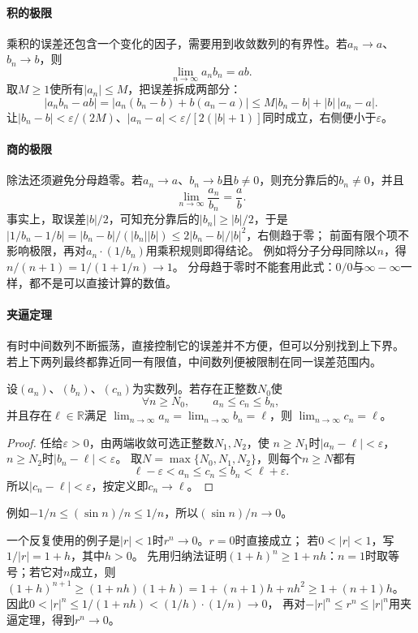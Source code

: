\paragraph{积的极限}
乘积的误差还包含一个变化的因子，需要用到收敛数列的有界性。若$a_n\to a$、$b_n\to b$，则
\[
 \lim_{n\to\infty}a_nb_n=ab.
\]
取$M\geq1$使所有$|a_n|\leq M$，把误差拆成两部分：
\[
 |a_nb_n-ab|=|a_n(b_n-b)+b(a_n-a)|\leq M|b_n-b|+|b|\,|a_n-a|.
\]
让$|b_n-b|<\varepsilon/(2M)$、$|a_n-a|<\varepsilon/[2(|b|+1)]$同时成立，右侧便小于$\varepsilon$。

\paragraph{商的极限}
除法还须避免分母趋零。若$a_n\to a$、$b_n\to b$且$b\neq0$，则充分靠后的$b_n\neq0$，并且
\[
 \lim_{n\to\infty}\frac{a_n}{b_n}=\frac ab.
\]
事实上，取误差$|b|/2$，可知充分靠后的$|b_n|\geq|b|/2$，于是
$|1/b_n-1/b|=|b_n-b|/(|b_n||b|)\leq2|b_n-b|/|b|^2$，右侧趋于零；
前面有限个项不影响极限，再对$a_n\cdot(1/b_n)$用乘积规则即得结论。
例如将分子分母同除以$n$，得$n/(n+1)=1/(1+1/n)\to1$。
分母趋于零时不能套用此式：$0/0$与$\infty-\infty$一样，都不是可以直接计算的数值。

\paragraph{夹逼定理}
有时中间数列不断振荡，直接控制它的误差并不方便，但可以分别找到上下界。
若上下两列最终都靠近同一有限值，中间数列便被限制在同一误差范围内。
\begin{theorem}[夹逼定理]
\label{thm:analysis-sequence-squeeze}
设$(a_n)$、$(b_n)$、$(c_n)$为实数列。若存在正整数$N_0$使
\[
 \forall n\geq N_0,\qquad a_n\leq c_n\leq b_n,
\]
并且存在$\ell\in\mathbb R$满足
$\lim_{n\to\infty}a_n=\lim_{n\to\infty}b_n=\ell$，则
$\lim_{n\to\infty}c_n=\ell$。
\end{theorem}
\begin{proof}
任给$\varepsilon>0$，由两端收敛可选正整数$N_1,N_2$，使
$n\geq N_1$时$|a_n-\ell|<\varepsilon$，$n\geq N_2$时$|b_n-\ell|<\varepsilon$。
取$N=\max\{N_0,N_1,N_2\}$，则每个$n\geq N$都有
\[
 \ell-\varepsilon<a_n\leq c_n\leq b_n<\ell+\varepsilon.
\]
所以$|c_n-\ell|<\varepsilon$，按定义即$c_n\to\ell$。
\end{proof}
例如$-1/n\leq(\sin n)/n\leq1/n$，所以$(\sin n)/n\to0$。

一个反复使用的例子是$|r|<1$时$r^n\to0$。$r=0$时直接成立；
若$0<|r|<1$，写$1/|r|=1+h$，其中$h>0$。
先用归纳法证明$(1+h)^n\geq1+nh$：$n=1$时取等号；若它对$n$成立，则
$(1+h)^{n+1}\geq(1+nh)(1+h)=1+(n+1)h+nh^2\geq1+(n+1)h$。
因此$0<|r|^n\leq1/(1+nh)<(1/h)\cdot(1/n)\to0$，
再对$-|r|^n\leq r^n\leq|r|^n$用夹逼定理，得到$r^n\to0$。

